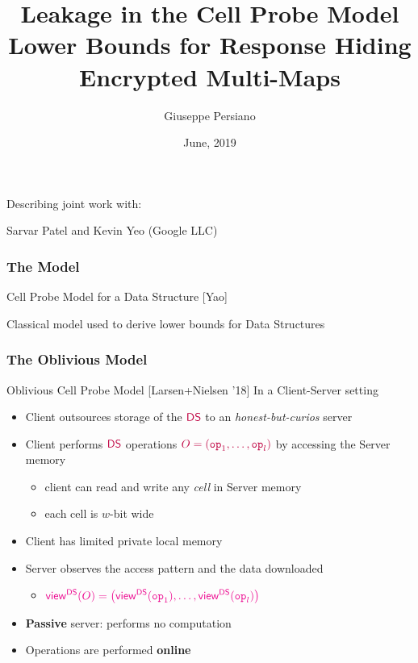 \documentclass[]{beamer}
\title[]{Leakage in the Cell Probe Model \\ Lower Bounds for Response Hiding Encrypted Multi-Maps}
\author{Giuseppe Persiano}
\institute[UNISA]{%
Universit\`a di Salerno\\ \qquad \\
}
\date[June 2019]{June, 2019}
\newcommand{\view}{{\mathsf{view}}}
\newcommand{\DS}{{\mathsf{DS}}}
\newcommand{\op}{{\mathtt{op}}}
\begin{document}
\newcommand{\zu}{\{0,1\}}
\newcommand{\ignore}[1]{}

\begin{frame}
  \titlepage

Describing joint work with:

Sarvar Patel and Kevin Yeo (Google LLC)
\end{frame}




\begin{frame}
\frametitle{The Model}

\begin{block}{Cell Probe Model for a Data Structure [Yao]}
\end{block}

\vfill
Classical model used to derive lower bounds for Data Structures
\end{frame}

\begin{frame}
\frametitle{The Oblivious Model}
\begin{block}{Oblivious Cell Probe Model [Larsen+Nielsen '18]}
In a Client-Server setting
\begin{itemize}
\item Client outsources storage of the $\color{purple} \DS$ to an {\color{purple} \em honest-but-curios} server
\item Client performs $\color{purple} \DS$ operations $\color{purple} O=(\op_1,\ldots,\op_l)$ by accessing the Server memory
    \begin{itemize}
    \item client can read and write any {\em cell} in Server memory
    \item each cell is $w$-bit wide
    \end{itemize}
\item Client has {\color{blue} limited} private local memory
\item Server observes the access pattern and the data downloaded
    \begin{itemize}
        \item $\color{magenta} \view^{\DS}(O)=
            \left(\view^\DS(\op_1),\ldots,\view^\DS(\op_l)\right)$
    \end{itemize}
    \item {\color{blue}\bf Passive} server: performs no computation
    \item Operations are performed {\color{blue}\bf online}
    \end{itemize}
    \end{block}
    \end{frame}
\end{document}
